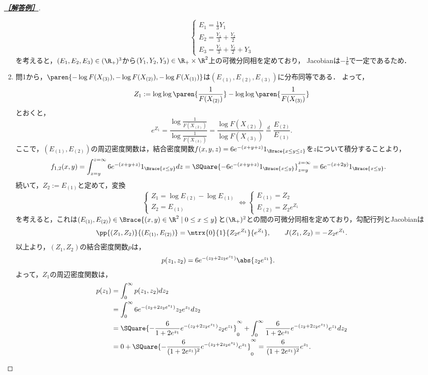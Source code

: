 \documentclass[uplatex,dvipdfmx]{jsarticle}
\begin{document}
\begin{proof}[\textbf{\underline{［解答例］}}]
\begin{enumerate}
\[\begin{cases}
            E_1=\frac{1}{3}Y_1\\
            E_2=\frac{Y_1}{3}+\frac{Y_2}{2}\\
            E_3=\frac{Y_1}{3}+\frac{Y_2}{2}+Y_3
        \end{cases}\]
        を考えると，$(E_1,E_2,E_3)\in(\R_+)^3$から$(Y_1,Y_2,Y_3)\in\R_+\times\R^2$上の可微分同相を定めており，
        Jacobianは$-\frac{1}{6}$で一定であるため．
        \item 問1から，$\paren{-\log F(X_{(3)}),-\log F(X_{(2)}),-\log F(X_{(1)})}$は$(E_{(1)},E_{(2)},E_{(3)})$に分布同等である．
        よって，
        \[Z_1:=\log\log\paren{\frac{1}{F(X_{(2)})}}-\log\log\paren{\frac{1}{F(X_{(3)})}}\]
        とおくと，
        \[e^{Z_1}=\frac{\log\frac{1}{F(X_{(2)})}}{\log\frac{1}{F(X_{(3)})}}=\frac{\log F(X_{(2)})}{\log F(X_{(3)})}\overset{d}{=}\frac{E_{(2)}}{E_{(1)}}.\]
        ここで，$(E_{(1)},E_{(2)})$の周辺密度関数は，結合密度関数$f(x,y,z)=6e^{-(x+y+z)}1_{\Brace{x\le y\le z}}$を$z$について積分することより，
        \begin{align*}
            f_{1,2}(x,y)&=\int^{z=\infty}_{z=y}6e^{-(x+y+z)}1_{\Brace{x\le y}}dz
            =\SQuare{-6e^{-(x+y+z)}1_{\Brace{x\le y}}}^{z=\infty}_{z=y}=6e^{-(x+2y)}1_{\Brace{x\le y}}.
        \end{align*}
        続いて，$Z_2:=E_{(1)}$と定めて，変換
        \[\begin{cases}
            Z_1=\log E_{(2)}-\log E_{(1)}\\
            Z_2=E_{(1)}
        \end{cases}\Leftrightarrow\begin{cases}
            E_{(1)}=Z_2\\
            E_{(2)}=Z_2e^{Z_1}
        \end{cases}\]
        を考えると，これは$(E_{(1)},E_{(2)})\in\Brace{(x,y)\in\R^2\mid0\le x\le y}$と$(\R_+)^2$との間の可微分同相を定めており，勾配行列とJacobianは
        \[\pp{(Z_1,Z_2)}{(E_{(1)},E_{(2)})}=\mtrx{0}{1}{Z_2e^{Z_1}}{e^{Z_1}},\qquad J(Z_1,Z_2)=-Z_2e^{Z_1}.\]
        以上より，$(Z_1,Z_2)$の結合密度関数$p$は，
        \begin{align*}
            p(z_1,z_2)&=6e^{-(z_2+2z_2e^{z_1})}\abs{z_2e^{z_1}}.
        \end{align*}
        よって，$Z_1$の周辺密度関数は，
        \begin{align*}
            p(z_1)&=\int^\infty_0p(z_1,z_2)dz_2\\
            &=\int^\infty_06e^{-(z_2+2z_2e^{z_1})}z_2e^{z_1}dz_2\\
            &=\SQuare{-\frac{6}{1+2e^{z_1}}e^{-(z_2+2z_2e^{z_1})}z_2e^{z_1}}^\infty_0+\int^\infty_0\frac{6}{1+2e^{z_1}}e^{-(z_2+2z_2e^{z_1})}e^{z_1}dz_2\\
            &=0+\SQuare{-\frac{6}{(1+2e^{z_1})^2}e^{-(z_2+2z_2e^{z_1})}e^{z_1}}^\infty_0=\frac{6}{(1+2e^{z_1})^2}e^{z_1}.
        \end{align*}
    \end{enumerate}
\end{proof}
\end{document}
